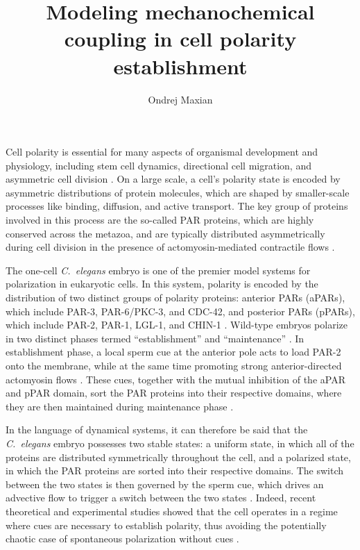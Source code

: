 \documentclass[11pt]{article}
\title{Modeling mechanochemical coupling in cell polarity establishment  \vspace{-0.5 cm}}
\author{Ondrej Maxian  \vspace{-0.75 cm}}
\newcommand{\6}[1]{#1_{\text{6}}}
\newcommand{\3}[1]{#1_{\text{3}}}
\begin{document}
\maketitle

Cell polarity is essential for many aspects of organismal development and physiology, including stem cell dynamics, directional cell migration, and asymmetric cell division \cite{dewey2015cell, goldstein2007proteins, ierushalmi2021cytoskeletal, maitre2016asymmetric}. On a large scale, a cell's polarity state is encoded by asymmetric distributions of protein molecules, which are shaped by smaller-scale processes like binding, diffusion, and active transport. The key group of proteins involved in this process are the so-called PAR proteins, which are highly conserved across the metazoa, and are typically distributed asymmetrically during cell division \cite{kemphues1988identification, lang2017proteins} in the presence of actomyosin-mediated contractile flows \cite{munro2004cortical}. 

The one-cell \emph{C.\ elegans} embryo is one of the premier model systems for polarization in eukaryotic cells. In this system, polarity is encoded by the distribution of two distinct groups of polarity proteins: anterior PARs (aPARs), which include PAR-3, PAR-6/PKC-3, and CDC-42, and posterior PARs (pPARs), which include PAR-2, PAR-1, LGL-1, and CHIN-1 \cite{lang2017proteins}. Wild-type embryos polarize in two distinct phases termed ``establishment'' and ``maintenance'' \cite{cuenca2003polarization}. In establishment phase, a local sperm cue at the anterior pole acts to load PAR-2 onto the membrane, while at the same time promoting strong anterior-directed actomyosin flows \cite{gan2021mechanochemical}. These cues, together with the mutual inhibition of the aPAR and pPAR domain, sort the PAR proteins into their respective domains, where they are then maintained during maintenance phase \cite{munro2004cortical, schonegg2006cdc}. 

In the language of dynamical systems, it can therefore be said that the \emph{C.\ elegans} embryo possesses two stable states: a uniform state, in which all of the proteins are distributed symmetrically throughout the cell, and a polarized state, in which the PAR proteins are sorted into their respective domains. The switch between the two states is then governed by the sperm cue, which drives an advective flow to trigger a switch between the two states \cite{goehring2011polarization, gross2019guiding}. Indeed, recent theoretical and experimental studies showed that the cell operates in a regime where cues are necessary to establish polarity, thus avoiding the potentially chaotic case of spontaneous polarization without cues \cite{gross2019guiding}.
\end{document}
